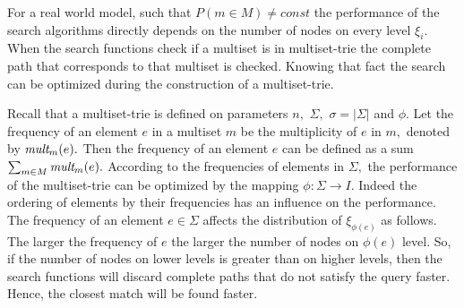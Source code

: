 For a real world model, such that $P(m\in M)\neq const$ the performance of the search 
algorithms directly depends on the number of nodes on every level $\xi_i.$ When 
the search functions check if a multiset is in multiset-trie the complete path that 
corresponds to that multiset is checked. Knowing that fact the search can be optimized 
during the construction of a multiset-trie. 

Recall that a multiset-trie is defined on parameters $n,$ $\Sigma,$ $\sigma = |\Sigma|$ 
and $\phi.$ Let the frequency of an element $e$ in a multiset $m$ be the multiplicity of 
$e$ in $m,$ denoted by $\emph{mult}_m(e).$ Then the frequency of an element $e$ 
can be defined as a sum $\sum_{m\in M} \emph{mult}_m(e).$ According to the frequencies 
of elements in $\Sigma,$ the performance of the multiset-trie can be optimized by 
the mapping $\phi : \Sigma \rightarrow I.$ Indeed the ordering of elements by their 
frequencies has an influence on the performance.
%
The frequency of an element $e\in\Sigma$ affects the distribution of $\xi_{\phi(e)}$ 
as follows. The larger the frequency of $e$ the larger the number of nodes on 
$\phi(e)$ level. 
So, if the number of nodes on lower levels is greater than on higher levels, then 
the search functions will discard complete paths that do not satisfy the query 
faster. Hence, the closest match will be found faster.

%

